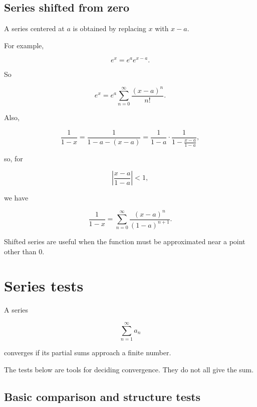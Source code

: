 \subsection{Series shifted from zero}
\label{appsubsec:shifted-series-table}

A series centered at \(a\) is obtained by replacing \(x\) with \(x-a\).

For example,

\[
e^{x}
=
e^a e^{x-a}.
\]

So

\[
\boxed{
e^x
=
e^a
\sum_{n=0}^{\infty}\frac{(x-a)^n}{n!}.
}
\]

Also,

\[
\frac1{1-x}
=
\frac1{1-a-(x-a)}
=
\frac1{1-a}\cdot
\frac1{1-\frac{x-a}{1-a}},
\]

so, for

\[
\left|\frac{x-a}{1-a}\right|<1,
\]

we have

\[
\boxed{
\frac1{1-x}
=
\sum_{n=0}^{\infty}\frac{(x-a)^n}{(1-a)^{n+1}}.
}
\]

Shifted series are useful when the function must be approximated near a point other
than \(0\).

\section{Series tests}
\label{appsec:series-tests}

A series

\[
\sum_{n=1}^{\infty}a_n
\]

converges if its partial sums approach a finite number.

The tests below are tools for deciding convergence.  They do not all give the sum.

\subsection{Basic comparison and structure tests}
\label{appsubsec:basic-series-tests-table}

